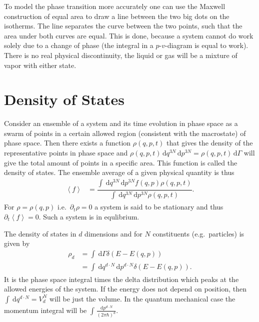 \documentclass[a4paper,10pt]{article}
\newcommand{\td}{\,\text{d}}
\numberwithin{equation}{section}
\begin{document}
\begin{multicols}{2}
To model the phase transition more accurately one can use the Maxwell construction of equal area to draw a line between the two big dots on the isotherms.
The line separates the curve between the two points, such that the area under both curves are equal.
This is done, because a system cannot do work solely due to a change of phase (the integral in a $p$-$v$-diagram is equal to work).
There is no real physical discontinuity, the liquid or gas will be a mixture of vapor with either state.


\section{Density of States}
Consider an ensemble of a system and its time evolution in phase space as a swarm of points in a certain allowed region (consistent with the macrostate) of phase space.
Then there exists a function $\rho \left(q,p,t\right)$ that gives the density of the representative points in phase space and $\rho \left(q,p,t\right)\td q ^{3N}\td p ^{3N}=\rho (q,p,t)\td \Gamma $ will give the total amount of points in a specific area.
This function is called the density of states.
The ensemble average of a given physical quantity is thus
\begin{align} 
  \left\langle f \right\rangle  &= \dfrac{\int_{}^{}\td q ^{3N}\td p ^{3N}f\left(q,p\right)\rho \left(q,p,t\right)}{\int_{}^{}\td q ^{3N}\td p ^{3N}\rho (q,p,t)}
.\end{align} 
For $\rho =\rho (q,p)$ i.e.\ $\partial_t \rho =0$ a system is said to be stationary and thus $\partial_t\left\langle f \right\rangle =0$.
Such a system is in equlibrium.

The density of states in $d$ dimensions and for $N$ constituents (e.g.\ particles) is given by
\begin{align} 
  \rho _d &= \int_{}^{}\td \Gamma \delta \left(E-E(q,p)\right)\\
        &= \int_{}^{}\td q ^{d\cdot N}\td p ^{d\cdot N}\delta (E-E(q,p))
.\end{align} 
It is the phase space integral times the delta distribution which peaks at the allowed energies of the system.
If the energy does not depend on position, then $\int_{}^{}\td q ^{d\cdot N}=V_d^N$ will be just the volume.
In the quantum mechanical case the momentum integral will be $\int_{}^{}\tfrac{\td p ^{d\cdot N}}{(2\pi \hbar )^d}$.


\end{multicols}
\end{document}
